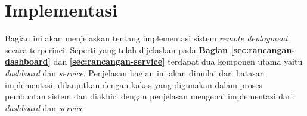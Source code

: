\section{Implementasi}

Bagian ini akan menjelaskan tentang implementasi sistem \textit{remote deployment} secara terperinci. Seperti yang telah dijelaskan pada  \textbf{Bagian \ref{sec:rancangan-dashboard}} dan \textbf{\ref{sec:rancangan-service}} terdapat dua komponen utama yaitu \textit{dashboard} dan \textit{service}. Penjelasan bagian ini akan dimulai dari batasan implementasi, dilanjutkan dengan kakas yang digunakan dalam proses pembuatan sistem dan diakhiri dengan penjelasan mengenai implementasi dari \textit{dashboard} dan \textit{service}









\pagebreak








% 
% 
% 
% 
% 


